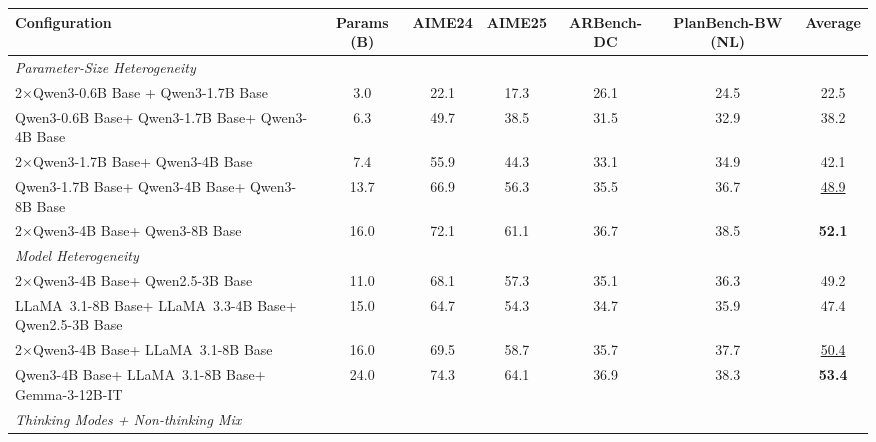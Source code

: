 \documentclass[sigconf]{aamas}
\begin{document}
\begin{table}[h!]
\small
\begin{tabular}{lcccccc}
\toprule
Configuration & Params (B) & AIME24 & AIME25 & ARBench-DC & PlanBench-BW (NL) & Average \\
\midrule
\multicolumn{7}{l}{\textit{Parameter-Size Heterogeneity}} \\
2$\times$Qwen3-0.6B Base + Qwen3-1.7B  Base            & 3.0  & 22.1 & 17.3 & 26.1 & 24.5 & 22.5 \\
Qwen3-0.6B Base+ Qwen3-1.7B Base+ Qwen3-4B  Base          & 6.3  & 49.7 & 38.5 & 31.5 & 32.9 & 38.2 \\
2$\times$Qwen3-1.7B Base+ Qwen3-4B Base               & 7.4  & 55.9 & 44.3 & 33.1 & 34.9 & 42.1 \\
Qwen3-1.7B Base+ Qwen3-4B Base+ Qwen3-8B Base              & 13.7 & 66.9 & 56.3 & 35.5 & 36.7 & \underline{48.9} \\
2$\times$Qwen3-4B Base+ Qwen3-8B Base                 & 16.0 & 72.1 & 61.1 & 36.7 & 38.5 & \textbf{52.1} \\
\midrule
\multicolumn{7}{l}{\textit{Model Heterogeneity}} \\
2$\times$Qwen3-4B Base+ Qwen2.5-3B Base               & 11.0 & 68.1 & 57.3 & 35.1 & 36.3 & 49.2 \\
LLaMA~3.1-8B Base+ LLaMA~3.3-4B Base+ Qwen2.5-3B Base     & 15.0 & 64.7 & 54.3 & 34.7 & 35.9 & 47.4 \\
2$\times$Qwen3-4B Base+ LLaMA~3.1-8B  Base            & 16.0 & 69.5 & 58.7 & 35.7 & 37.7 & \underline{50.4} \\
Qwen3-4B Base+ LLaMA~3.1-8B Base+ Gemma-3-12B-IT      & 24.0 & 74.3 & 64.1 & 36.9 & 38.3 & \textbf{53.4} \\
\midrule
\multicolumn{7}{l}{\textit{Thinking Modes + Non-thinking Mix}} \\

\end{tabular}
\end{table}
\end{document}

